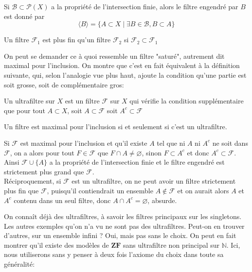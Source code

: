 \documentclass{article}
\begin{document}
\begin{definition}
    Si $\mathcal{B} \subset \mathcal{P}(X)$ a la propriété de l'intersection finie, alors le filtre engendré par $B$ est donné par $$\langle B \rangle = \{A \subset X \mid \exists B \in \mathcal{B}, B \subset A\}$$
\end{definition}

\begin{definition}
    Un filtre $\mathcal{F}_1$ est plus fin qu'un filtre $\mathcal{F}_2$ si $\mathcal{F}_2 \subset \mathcal{F}_1$
\end{definition}

On peut se demander ce à quoi ressemble un filtre "saturé", autrement dit maximal pour l'inclusion. On montre que c'est en fait équivalent à la définition suivante, qui, selon l'analogie vue plus haut, ajoute la condition qu'une partie est soit grosse, soit de complémentaire gros:

\begin{definition}
    Un ultrafiltre sur $X$ est un filtre $\mathcal{F}$ sur $X$ qui vérifie la condition supplémentaire que pour tout $A \subset X$, soit $A \subset \mathcal{F}$ soit $A^c \subset \mathcal{F}$
\end{definition}

\begin{proposition}
    Un filtre est maximal pour l'inclusion si et seulement si c'est un ultrafiltre.
\end{proposition}

\begin{preuve}
    Si $\mathcal{F}$ est maximal pour l'inclusion et qu'il existe $A$ tel que ni $A$ ni $A^c$ ne soit dans $\mathcal{F}$, on a alors pour tout $F \in \mathcal{F}$ que $F \cap A \neq \varnothing$, sinon $F \subset A^c$ et donc $A^c \subset \mathcal{F}$. Ainsi $\mathcal{F} \cup \{A\}$ a la propriété de l'intersection finie et le filtre engendré est strictement plus grand que $\mathcal{F}$.\\

    Réciproquement, si $\mathcal{F}$ est un ultrafiltre, on ne peut avoir un filtre strictement plus fin que $\mathcal{F}$, puisqu'il contiendrait un ensemble $A \not\in \mathcal{F}$ et on aurait alors $A$ et $A^c$ contenu dans un seul filtre, donc $A \cap A^c = \varnothing$, absurde.\\
\end{preuve}

On connaît déjà des ultrafiltres, à savoir les filtres principaux sur les singletons. Les autres exemples qu'on n'a vu ne sont pas des ultrafiltres. Peut-on en trouver d'autres, sur un ensemble infini ? Oui, mais pas sans le choix. On peut en fait montrer qu'il existe des modèles de $\mathbf{ZF}$ sans ultrafiltre non principal sur $\mathbb{N}$. Ici, nous utiliserons sans y penser à deux fois l'axiome du choix dans toute sa généralité:
\end{document}
